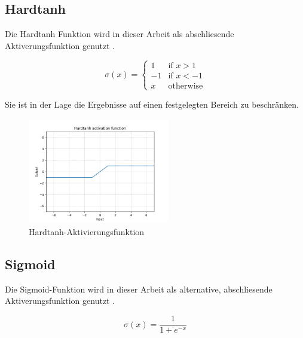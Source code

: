 \subsection{Hardtanh}
\label{sec:hardtanh}

Die Hardtanh Funktion wird in dieser Arbeit als abschliesende Aktiverungsfunktion genutzt \cite{DBLP:journals/corr/abs-1811-03378, Collobert:2011:NLP:1953048.2078186}.

\begin{equation}
	\sigma(x) = {
		\begin{cases}
			1  & {\text{if }} x > 1 \\ 
			-1 & {\text{if }} x < -1 \\
			x  & {\text{otherwise}}
		\end{cases}
	 }
\end{equation}

\pagebreak

Sie ist in der Lage die Ergebnisse auf einen festgelegten Bereich zu beschränken.

\begin{figure}[H]
	\centering
	\includegraphics[width=0.55\textwidth]{resources/content/Hardtanh.png}
	\caption{Hardtanh-Aktivierungsfunktion \cite{hardtanh_activation_function_img}}
	\label{img:hardtanh_activation_function}
\end{figure}

\subsection{Sigmoid}
\label{sec:sigmoid}

Die Sigmoid-Funktion wird in dieser Arbeit als alternative, abschliesende Aktiverungsfunktion genutzt \cite{DBLP:journals/corr/abs-1811-03378}.

\begin{equation}
	\sigma(x) = \frac{ 1 } { 
		1 + e^{ -x }
	}
\end{equation}

